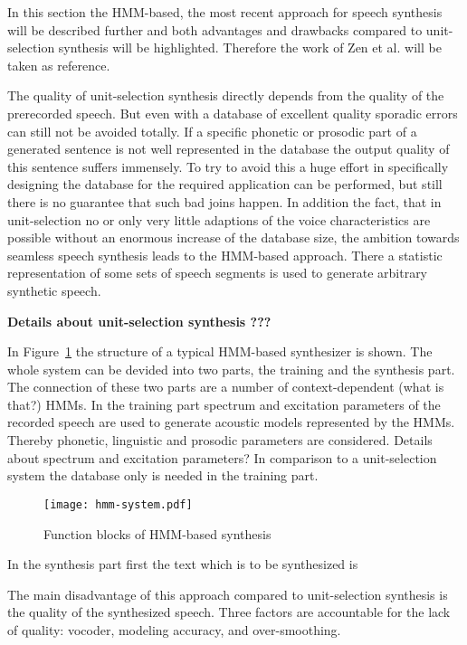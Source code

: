 In this section the \ac{HMM}-based, the most recent approach for speech synthesis will be described further and both advantages and drawbacks compared to unit-selection synthesis will be highlighted. Therefore the work of Zen et al. \cite{zen:statistical} will be taken as reference.

The quality of unit-selection synthesis directly depends from the quality of the prerecorded speech. But even with a database of excellent quality sporadic errors can still not be avoided totally. If a specific phonetic or prosodic part of a generated sentence is not well represented in the database the output quality of this sentence suffers immensely. To try to avoid this a huge effort in specifically designing the database for the required application can be performed, but still there is no guarantee that such bad joins happen. In addition the fact, that in unit-selection no or only very little adaptions of the voice characteristics are possible without an enormous increase of the database size, the ambition towards seamless speech synthesis leads to the \ac{HMM}-based approach. There a statistic representation of some sets of speech segments is used to generate arbitrary synthetic speech.

\textbf{{\color{ACMRed}Details about unit-selection synthesis ???}}

In Figure~\ref{fig:hmm} the structure of a typical \ac{HMM}-based synthesizer is shown. The whole system can be devided into two parts, the training and the synthesis part. The connection of these two parts are a number of context-dependent ({\color{ACMRed}what is that?}) \acp{HMM}. In the training part spectrum and excitation parameters of the recorded speech are used to generate acoustic models represented by the \acp{HMM}. Thereby phonetic, linguistic and prosodic parameters are considered. {\color{ACMRed}Details about spectrum and excitation parameters?} In comparison to a unit-selection system the database only is needed in the training part.

\begin{figure}[h]
	\texttt{[image: hmm-system.pdf]}
	\caption{Function blocks of \ac{HMM}-based synthesis \cite{zen:statistical}}
	\label{fig:hmm}
\end{figure}

In the synthesis part first the text which is to be synthesized is 

\newpage

The main disadvantage of this approach compared to unit-selection synthesis is the quality of the synthesized speech. Three factors are accountable for the lack of quality: vocoder, modeling accuracy, and over-smoothing.

